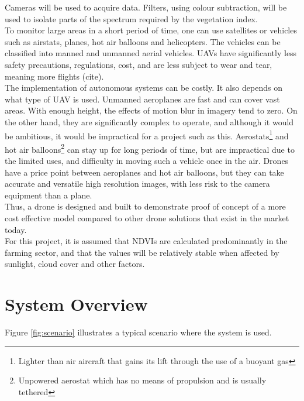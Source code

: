 Cameras will be used to acquire data. Filters, using colour subtraction, will be used to isolate parts of the spectrum required by the vegetation index.\\

To monitor large areas in a short period of time, one can use satellites or vehicles such as airstats, planes, hot air balloons and helicopters. The vehicles can be classified into manned and unmanned aerial vehicles. UAVs have significantly less safety precautions, regulations, cost, and are less subject to wear and tear, meaning more flights (cite).\\


The implementation of autonomous systems can be costly. It also depends on what type of UAV is used. Unmanned aeroplanes  are fast and can cover vast areas. With enough height, the effects of motion blur in imagery tend to zero. On the other hand, they are significantly complex to operate, and although it would be ambitious, it would be impractical for a project such as this. Aerostats\footnote{Lighter than air aircraft that gains its lift through the use of a buoyant gas} and hot air balloons\footnote{Unpowered aerostat which has no means of propulsion and is usually tethered} can stay up for long periods of time, but are impractical due to the limited uses, and difficulty in moving such a vehicle once in the air. Drones have a price point between aeroplanes and hot air balloons, but they can take accurate and versatile high resolution images, with less risk to the camera equipment than a plane.\\

Thus, a drone is designed and built to demonstrate proof of concept of a more cost effective model compared to other drone solutions that exist in the market today.\\

For this project, it is assumed that NDVIs are calculated predominantly in the farming sector, and that the values will be relatively stable when affected by sunlight, cloud cover and other factors.

\section{System Overview}

Figure \ref{fig:scenario} illustrates a typical scenario where the system is used.\\

